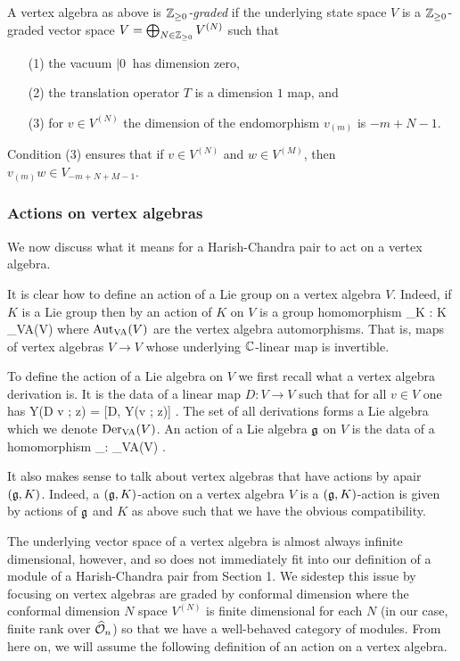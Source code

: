 \begin{dfn}
A vertex algebra as above is {\em $\mathbb Z_{\geq 0}$-graded} if 
the underlying state space $V$ is a $\mathbb Z_{\geq 0}$-graded vector space $V = \bigoplus_{N \in \mathbb Z_{\geq 0}} V^{(N)}$
such that 
\begin{enumerate}
\item[(1)] the vacuum $\left|0\>$ has dimension zero, 
\item[(2)] the translation operator $T$ is a dimension $1$ map, and 
\item[(3)] for $v \in V^{(N)}$ the dimension of the endomorphism $v_{(m)}$ is $-m + N -1$. 
\end{enumerate}
\end{dfn}

Condition (3) ensures that  if $v \in V^{(N)}$ and $w \in V^{(M)}$, 
then $v_{(m)} w \in V_{-m + N + M-1}$. 


\subsubsection{Actions on vertex algebras}

We now discuss what it means for a Harish-Chandra pair to act on a
vertex algebra. 

It is clear how to define an action of a Lie group on a vertex
algebra $V$. Indeed, if $K$ is a Lie group then by an action of $K$ on
$V$ is a group homomorphism
\ben
\rho_K : K \to \Aut_{{\rm VA}}(V)
\een
where ${\rm Aut}_{{\rm VA}}(V)$ are the vertex algebra automorphisms. That is,
maps of vertex algebras $V \to V$ whose underlying $\mathbb C$-linear map is
invertible.  

To define the action of a Lie algebra on $V$ we first recall what a
vertex algebra derivation is. It is the data of a linear map $D : V
\to V$ such that for all $v \in V$ one has
\ben
Y(D v ; z) = [D, Y(v ; z)] .
\een 
The set of all derivations forms a Lie algebra which we denote
${\rm Der}_{{\rm VA}}(V)$. An action of a Lie algebra $\mathfrak g$ on $V$ is the data
of a homomorphism
\ben
\rho_\fg : \fg \to \Der_{{\rm VA}}(V) .
\een 

It also makes sense to talk about vertex algebras that have actions by
apair $(\mathfrak g,K)$. Indeed, a $(\mathfrak g,K)$-action on a vertex algebra $V$ is
a $(\mathfrak g,K)$-action is given by actions of $\mathfrak g$ and $K$ as above such
that we have the obvious compatibility. 

The underlying vector space of a vertex algebra is almost always infinite dimensional, however,
and so does not immediately fit into our definition of a module of a Harish-Chandra pair from Section 1. 
We sidestep this issue by focusing on vertex algebras are graded by conformal dimension where the conformal dimension $N$ space $V^{(N)}$ is finite dimensional for each $N$
(in our case, finite rank over $\widehat{\mathcal O}_n$) 
so that we have a well-behaved category of modules. 
From here on, we will assume the following definition of an action on
a vertex algebra. 

